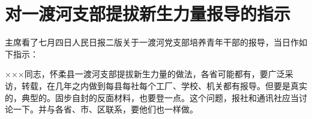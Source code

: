 \section[对一渡河支部提拔新生力量报导的指示（一九六四年七月四日）]{对一渡河支部提拔新生力量报导的指示}


主席看了七月四日人民日报二版关于一渡河党支部培养青年干部的报导，当日作如下指示：

×××同志，怀柔县一渡河支部提拔新生力量的做法，各省可能都有，要广泛采访，转载，在几年之内做到每县每社每个工厂、学校、机关都有报导。但要是真实的，典型的。固步自封的反面材料，也要登一点。这个问题，报社和通讯社应当讨论一下。并与各省、市、区联系，要他们也一样做。


